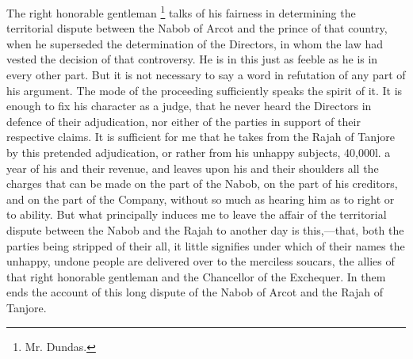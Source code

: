 The right honorable gentleman
\footnote{ Mr. Dundas.}
 talks of his fairness in determining the territorial dispute between the Nabob of Arcot and the prince of that country, when he superseded the determination of the Directors, in whom the law had vested the decision of that controversy. He is in this just as feeble as he is in every other part. But it is not necessary to say a word in refutation of any part of his argument. The mode of the proceeding sufficiently speaks the spirit of it. It is enough to fix his character as a judge, that he never heard the Directors in defence of their adjudication, nor either of the parties in support of their respective claims. It is sufficient for me that he takes from the Rajah of Tanjore by this pretended adjudication, or rather from his unhappy subjects, 40,000l. a year of his and their revenue, and leaves upon his and their shoulders all the charges that can be made on the part of the Nabob, on the part of his creditors, and on the part of the Company, without so much as hearing him as to right or to ability. But what principally induces me to leave the affair of the territorial dispute between the Nabob and the Rajah to another day is this,—that, both the parties being stripped of their all, it little signifies under which of their names the unhappy, undone people are delivered over to the merciless soucars, the allies of that right honorable gentleman and the Chancellor of the Exchequer. In them ends the account of this long dispute of the Nabob of Arcot and the Rajah of Tanjore.

